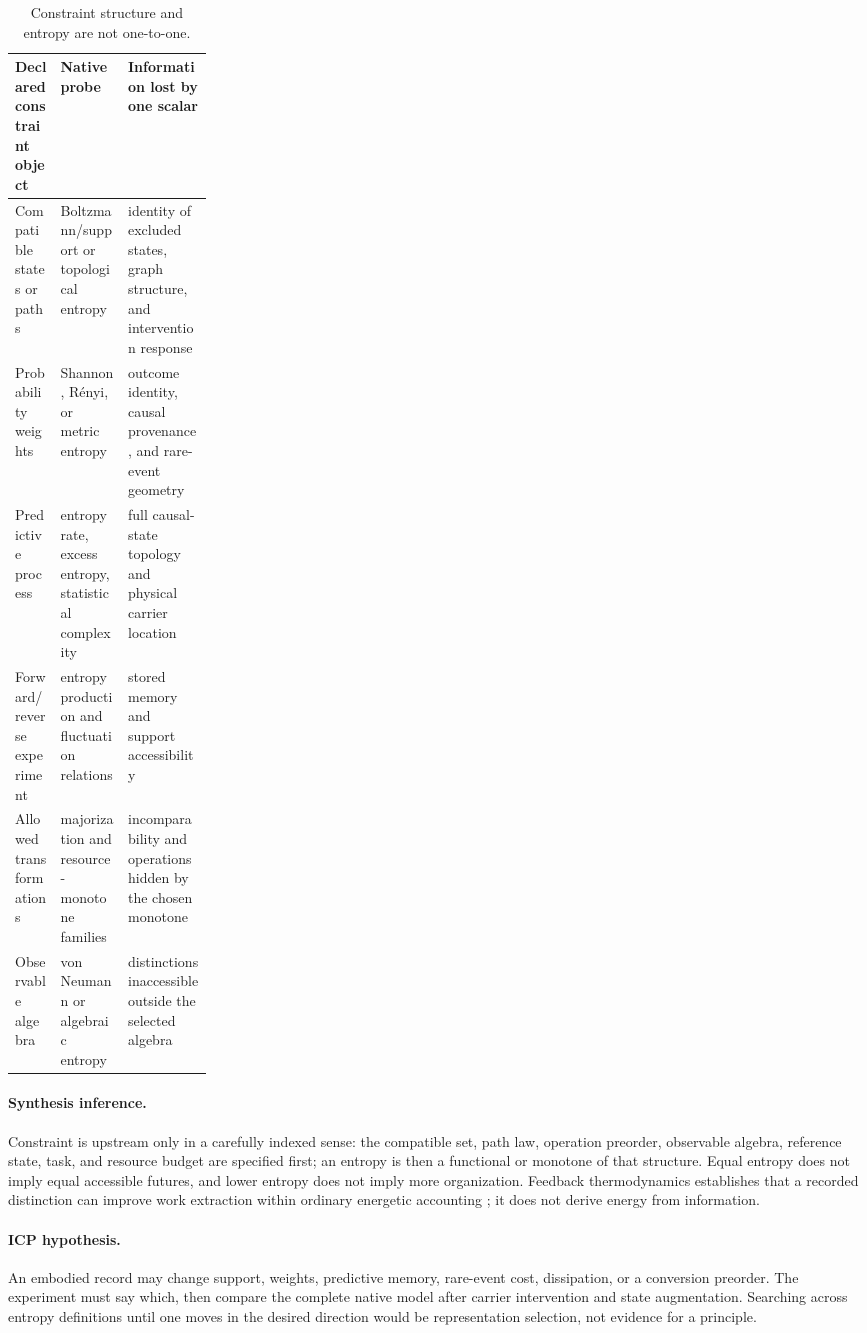 \begin{table}[t]
\centering
\small
\caption{Constraint structure and entropy are not one-to-one.}
\label{tab:constraint-entropy}
\begin{tabularx}{\linewidth}{@{}>{\raggedright\arraybackslash}p{0.23\linewidth}
  >{\raggedright\arraybackslash}X >{\raggedright\arraybackslash}X@{}}
\toprule
Declared constraint object & Native probe & Information lost by one scalar \\
\midrule
Compatible states or paths & Boltzmann/support or topological entropy
& identity of excluded states, graph structure, and intervention response \\
Probability weights & Shannon, R\'enyi, or metric entropy
& outcome identity, causal provenance, and rare-event geometry \\
Predictive process & entropy rate, excess entropy, statistical complexity
& full causal-state topology and physical carrier location \\
Forward/reverse experiment & entropy production and fluctuation relations
& stored memory and support accessibility \\
Allowed transformations & majorization and resource-monotone families
& incomparability and operations hidden by the chosen monotone \\
Observable algebra & von Neumann or algebraic entropy
& distinctions inaccessible outside the selected algebra \\
\bottomrule
\end{tabularx}
\end{table}

\paragraph{Synthesis inference.}
Constraint is upstream only in a carefully indexed sense: the compatible set,
path law, operation preorder, observable algebra, reference state, task, and
resource budget are specified first; an entropy is then a functional or
monotone of that structure.  Equal entropy does not imply equal accessible
futures, and lower entropy does not imply more organization.  Feedback
thermodynamics establishes that a recorded distinction can improve work
extraction within ordinary energetic accounting
\citep{SagawaUeda2010Feedback,ToyabeEtAl2010InformationEnergy}; it does not
derive energy from information.

\paragraph{ICP hypothesis.}
An embodied record may change support, weights, predictive memory, rare-event
cost, dissipation, or a conversion preorder.  The experiment must say which,
then compare the complete native model after carrier intervention and state
augmentation.  Searching across entropy definitions until one moves in the
desired direction would be representation selection, not evidence for a
principle.

